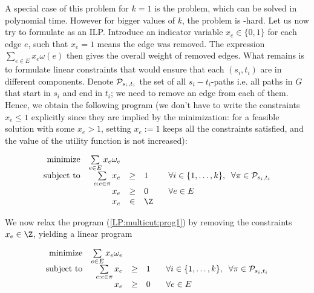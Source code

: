 \noindent
A special case of this problem for $k=1$ is the \mincut problem, which can be solved in polynomial time. 
However for bigger values of $k$, the \minmulticut problem is \NP-hard. Let us now try to formulate
\minmulticut as an ILP. Introduce  an indicator variable $x_e\in\{0,1\}$ for each edge $e$, such that
$x_e=1$ means the edge was removed. The expression $\sum_{e\in E}x_e\omega(e)$ then gives the
overall weight of removed edges. What remains is to formulate linear constraints that would ensure
that each $(s_i,t_i)$ are in different components. Denote ${\cal P}_{s_i,t_i}$ the set of all $s_i-t_i$-paths
i.e. all paths in $G$ that start in $s_i$ and end in $t_i$; we need to remove an edge from each of them. 
Hence, we obtain the following program (we don't have to write the constraints $x_e\le1$ explicitly
since they are implied by the minimization: for a feasible solution with some $x_e>1$, setting $x_e:=1$ 
keeps all the constraints satisfied, and the value of the utility function is not increased):


\begin{equation}
\label{LP:multicut:prog1}
\begin{array}{rrcll}
  {\rm minimize}     & \multicolumn{1}{l}{ \sum\limits_{e\in E}x_e\omega_e}\\
  {\rm subject\ to} & \sum\limits_{e:e\in\pi}x_e&\ge&1& \;\;\;
                              \forall i\in\{1,\ldots,k\},\;\; \forall \pi\in {\cal P}_{s_i,t_i}\\
                          & x_e&\ge&0& \;\;\;\forall e\in E\\
                          & x_e&\in&\Z
\end{array}
\end{equation}


\noindent
We now relax the program (\ref{LP:multicut:prog1}) by removing the constraints $x_e\in\Z$, yielding
a linear program

\begin{equation}
\label{LP:multicut:prog2}
\begin{array}{rrcll}
  {\rm minimize}     & \multicolumn{1}{l}{ \sum\limits_{e\in E}x_e\omega_e}\\
  {\rm subject\ to} & \sum\limits_{e:e\in\pi}x_e&\ge&1& \;\;\;
                              \forall i\in\{1,\ldots,k\},\;\; \forall \pi\in {\cal P}_{s_i,t_i}\\
                          & x_e&\ge&0& \;\;\;\forall e\in E\\
\end{array}
\end{equation}

